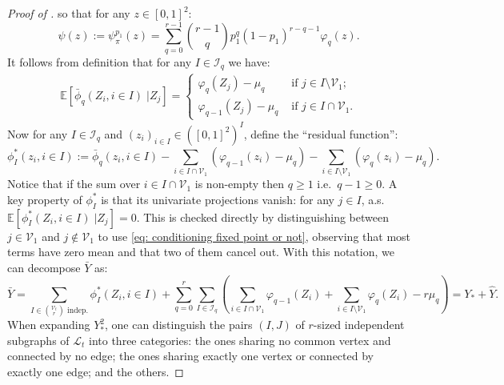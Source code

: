 \documentclass{article}
\theoremstyle{remark}
\def\m{\!-\!}
\newcommand{\mean}[1]{\mathbb{E}\left[#1\right]}
\def\carre{[0,1]^2}
\def\L{\mathcal{L}}
\def\Vert{\mathcal{V}}
\begin{document}
\begin{proof}[Proof of ]
    so that for any $z\in\carre$:
    \begin{equation}\label{eq: decomposition psi with fixed points}
        \psi(z) := \psi_\pi^{p_1}(z) = \sum_{q=0}^{r-1} 
        \binom{r-1}{q}p_1^q(1-p_1)^{r-q-1}
        \varphi_q(z) .
    \end{equation}
    It follows from definition that for any $I\in\mathcal{I}_q$ we have:
    \begin{align}\label{eq: conditioning fixed point or not}
        \mean{\bar\phi_q(Z_i,i\in I) \;\big| Z_j} =
        \left\{
        \begin{array}{ll}
            \varphi_q(Z_j) - \mu_q & \text{ if }j\in I\setminus\Vert_1 ;\\
            \varphi_{q-1}(Z_j) - \mu_q & \text{ if }j\in I\cap\Vert_1 .
        \end{array}
        \right.
    \end{align}
    Now for any $I\in\mathcal{I}_q$ and $(z_i)_{i\in I}\in\left(\carre\right)^I$, define the ``residual function'':
    \begin{equation*}
        \phi_I^*(z_i,i\in I)
        := \bar\phi_q(z_i,i\in I) 
        - \sum_{i\in I\cap \Vert_1} \left(\varphi_{q\m1}(z_i)-\mu_{q}\right)
        - \sum_{i\in I\setminus \Vert_1} \left(\varphi_q(z_i)-\mu_{q}\right) .
    \end{equation*}
    Notice that if the sum over $i\in I\cap \Vert_1$ is non-empty then $q\ge1$ i.e.~$q\m1\ge0$.
    A key property of $\phi_I^*$ is that its univariate projections vanish:
    for any $j\in I$, a.s.~$\mean{\phi_I^*(Z_i,i\in I) \;\big| Z_j}=0$.
    This is checked directly by distinguishing between $j\in\Vert_1$ and $j\notin\Vert_1$ to use \eqref{eq: conditioning fixed point or not}, observing that most terms have zero mean and that two of them cancel out.
    With this notation, we can decompose $\bar Y$ as:
    \begin{equation*}
        \bar Y 
        = \sum_{I\in\binom{\Vert_t}{r}\text{ indep.}} \phi_I^*(Z_i,i\in I)
        + \sum_{q=0}^r\sum_{I\in\mathcal{I}_q}\left(\sum_{i\in I\cap \Vert_1}\varphi_{q\m1}(Z_i) + \sum_{i\in I\setminus \Vert_1}\varphi_q(Z_i) - r\mu_{q}\right)
        = Y_* + \hat Y.
    \end{equation*}
    When expanding $Y_*^2$, one can distinguish the pairs $(I,J)$ of $r$-sized independent subgraphs of $\L_t$ into three categories: the ones sharing no common vertex and connected by no edge; the ones sharing exactly one vertex or connected by exactly one edge; and the others.

\end{proof}
\end{document}
